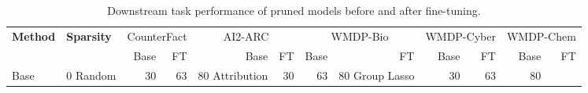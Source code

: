 \begin{table}[t]
\centering
\caption{Downstream task performance of pruned models before and after fine-tuning.}
\label{tab:pruned_results}
\begin{tabular}{@{}llrrrrrrrrrr@{}}
\toprule
\textbf{Method} & \textbf{Sparsity} & \multicolumn{2}{c}{CounterFact} & \multicolumn{2}{c}{AI2-ARC} & \multicolumn{2}{c}{WMDP-Bio} & \multicolumn{2}{c}{WMDP-Cyber} & \multicolumn{2}{c}{WMDP-Chem} \\
\cmidrule(lr){3-4} \cmidrule(lr){5-6} \cmidrule(lr){7-8} \cmidrule(lr){9-10} \cmidrule(lr){11-12}
& & Base & FT & Base & FT & Base & FT & Base & FT & Base & FT \\
\midrule
Base & 0%
\midrule
Random & 30%
 & 63%
 & 80%
\midrule
Attribution & 30%
 & 63%
 & 80%
\midrule
Group Lasso & 30%
 & 63%
 & 80%
\bottomrule
\end{tabular}
\end{table}
